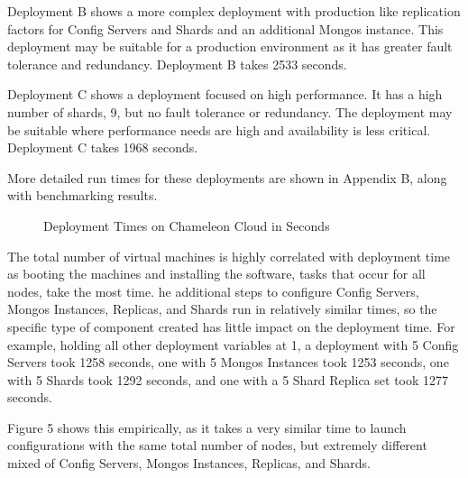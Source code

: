 \documentclass[9pt,twocolumn,twoside]{../../styles/osajnl}
\begin{document}
Deployment B shows a more complex deployment with production like replication factors for Config Servers and Shards and an additional Mongos instance.  This deployment may be suitable for a production environment as it has greater fault tolerance and redundancy.  Deployment B takes 2533 seconds.

Deployment C shows a deployment focused on high performance.  It has a high number of shards, 9, but no fault tolerance or redundancy.  The deployment may be suitable where performance needs are high and availability is less critical.  Deployment C takes 1968 seconds.

More detailed run times for these deployments are shown in Appendix B, along with benchmarking results.

\begin{figure}[ht]
  \caption{Deployment Times on Chameleon Cloud in Seconds}
\end{figure}

The total number of virtual machines is highly correlated with deployment time as booting the machines and installing the software, tasks that occur for all nodes, take the most time.  he additional steps to configure Config Servers, Mongos Instances, Replicas, and Shards run in relatively similar times, so the specific type of component created has little impact on the deployment time.  For example, holding all other deployment variables at 1, a deployment with 5 Config Servers took 1258 seconds, one with 5 Mongos Instances took 1253 seconds, one with 5 Shards took 1292 seconds, and one with a 5 Shard Replica set took 1277 seconds.

Figure 5 shows this empirically, as it takes a very similar time to launch configurations with the same total number of nodes, but extremely different mixed of Config Servers, Mongos Instances, Replicas, and Shards.
\end{document}
